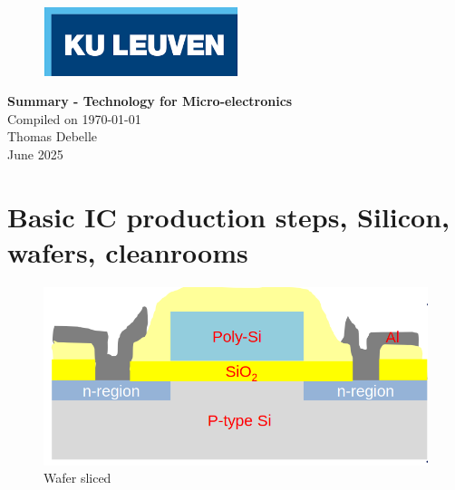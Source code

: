 \documentclass{report}
\begin{document}





\begin{titlepage}
    \begin{figure}
        \includegraphics[height = 2cm]{KULlogo.png}
        \label{fig:my_label}
    \end{figure}

    \hspace*{100cm}
    \centering
    \vspace*{7cm}

    {\Huge \textbf{Summary - Technology for Micro-electronics}}\\
    \vspace*{0.25cm}
    Compiled on \today\\
    \vspace*{0.25cm}
    \Large{Thomas Debelle}\\

    \vspace*{8.5cm} %
    {\Large June 2025}
\end{titlepage}

\tableofcontents
\newpage

\chapter{Basic IC production steps, Silicon, wafers, cleanrooms}

\begin{figure}
  \begin{center}
    \includegraphics[width=0.95\linewidth]{slice_wafer.png}
  \end{center}
  \caption{Wafer sliced}
  \label{fig:Wafer_slice}
\end{figure}
\end{document}
